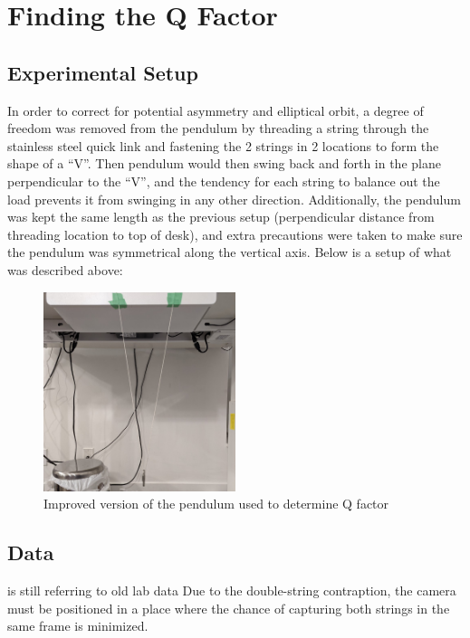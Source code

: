 \documentclass[12pt]{article}
\begin{document}
\newpage

\section{Finding the Q Factor} \label{Finding the Q Factor}

\subsection{Experimental Setup}
In order to correct for potential asymmetry and elliptical orbit, a degree of freedom was removed from the pendulum by threading a string through the stainless steel quick link and fastening the 2 strings in 2 locations to form the shape of a ``V''. Then pendulum would then swing back and forth in the plane perpendicular to the ``V'', and the tendency for each string to balance out the load prevents it from swinging in any other direction. Additionally, the pendulum was kept the same length as the previous setup (perpendicular distance from threading location to top of desk), and extra precautions were taken to make sure the pendulum was symmetrical along the vertical axis. Below is a setup of what was described above:
\begin{figure}[!hptb]
    \centering
    \includegraphics[width=0.5\textwidth]{../figures/exp_setup2.jpg}
    \caption{\centering Improved version of the pendulum used to determine Q factor}
    \label{fig:figure 3}
\end{figure}

\newpage

\subsection{Data}
{\color{blue}
is still referring to old lab data
}
Due to the double-string contraption, the camera must be positioned in a place where the chance of capturing both strings in the same frame is minimized.
\end{document}

